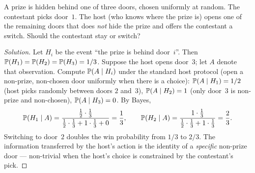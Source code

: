 \begin{problem}
\label{prob:monty-hall}
A prize is hidden behind one of three doors, chosen uniformly at
random. The contestant picks door~$1$. The host (who knows where the
prize is) opens one of the remaining doors that does \emph{not} hide
the prize and offers the contestant a switch. Should the contestant
stay or switch?
\end{problem}

\begin{proof}[Solution]
Let $H_i$ be the event ``the prize is behind door~$i$''. Then
$\mathbb{P}(H_1) = \mathbb{P}(H_2) = \mathbb{P}(H_3) = 1/3$. Suppose the host opens
door~$3$; let $A$ denote that observation. Compute
$\mathbb{P}(A \mid H_i)$ under the standard host protocol (open a
non-prize, non-chosen door uniformly when there is a choice):
$\mathbb{P}(A \mid H_1) = 1/2$ (host picks randomly between doors $2$
and~$3$), $\mathbb{P}(A \mid H_2) = 1$ (only door~$3$ is non-prize and
non-chosen), $\mathbb{P}(A \mid H_3) = 0$. By Bayes,
\[
  \mathbb{P}(H_1 \mid A) = \frac{\tfrac{1}{2} \cdot \tfrac{1}{3}}{\tfrac{1}{2} \cdot \tfrac{1}{3} + 1 \cdot \tfrac{1}{3} + 0} = \frac{1}{3},
  \qquad
  \mathbb{P}(H_2 \mid A) = \frac{1 \cdot \tfrac{1}{3}}{\tfrac{1}{2} \cdot \tfrac{1}{3} + 1 \cdot \tfrac{1}{3}} = \frac{2}{3}.
\]
Switching to door~$2$ doubles the win probability from $1/3$ to
$2/3$. The information transferred by the host's action is the
identity of a \emph{specific} non-prize door — non-trivial when the
host's choice is constrained by the contestant's pick.
\end{proof}

